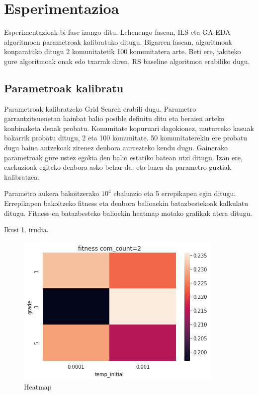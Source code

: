 \documentclass[sigconf]{acmart}
\begin{document}
\section{Esperimentazioa}
Esperimentazioak bi fase izango ditu. Lehenengo fasean, ILS eta GA-EDA algoritmoen parametroak kalibratuko ditugu. Bigarren fasean, algoritmoak konparatuko ditugu 2 komunitatetik 100 komunitatera arte. Beti ere, jakiteko gure algoritmoak onak edo txarrak diren, RS baseline algoritmoa erabiliko dugu.

\subsection{Parametroak kalibratu}
Parametroak kalibratzeko Grid Search erabili dugu. Parametro garrantzitsuenetan hainbat balio posible definitu ditu eta beraien arteko konbinaketa denak probatu. Komunitate kopuruari dagokionez, muturreko kasuak bakarrik probatu ditugu, 2 eta 100 komunitate. 50 komunitaterekin ere probatu dugu baina antzekoak zirenez denbora aurrezteko kendu dugu. Gainerako parametroak gure ustez egokia den balio estatiko batean utzi ditugu. Izan ere, exekuzioak egiteko denbora asko behar da, eta luzea da parametro guztiak kalibratzea. 

Parametro aukera bakoitzerako $10^4$ ebaluazio eta 5 errepikapen egin ditugu. Errepikapen bakoitzeko fitness eta denbora balioaekin batazbestekoak kalkulatu ditugu. Fitness-en batazbesteko balioekin heatmap motako grafikak atera ditugu.

Ikusi \ref{fig:heatmap}. irudia.

\begin{figure}
    \centering
    \includegraphics[width=\linewidth]{heatmap}
    \caption{Heatmap}
    \label{fig:heatmap}
\end{figure}
\end{document}
